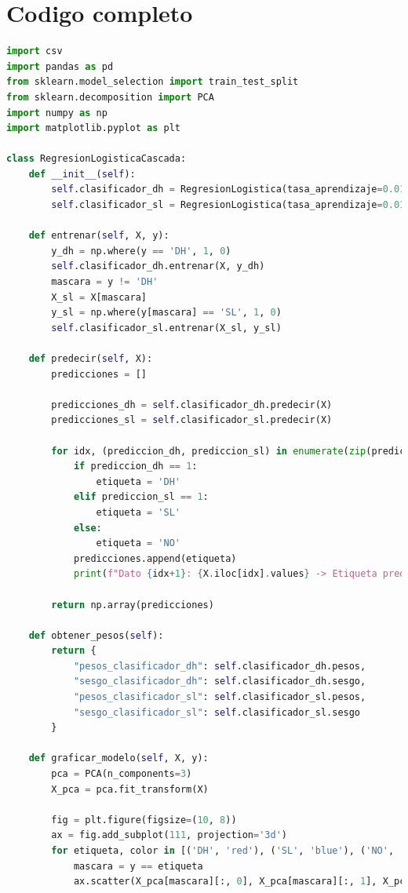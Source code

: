 \documentclass[12pt]{article}
\begin{document}
\section*{Codigo completo}
\begin{lstlisting}[language=Python]
import csv
import pandas as pd
from sklearn.model_selection import train_test_split
from sklearn.decomposition import PCA
import numpy as np
import matplotlib.pyplot as plt

class RegresionLogisticaCascada:
    def __init__(self):
        self.clasificador_dh = RegresionLogistica(tasa_aprendizaje=0.01, num_iteraciones=1000)
        self.clasificador_sl = RegresionLogistica(tasa_aprendizaje=0.01, num_iteraciones=1000)

    def entrenar(self, X, y):
        y_dh = np.where(y == 'DH', 1, 0)
        self.clasificador_dh.entrenar(X, y_dh)
        mascara = y != 'DH'
        X_sl = X[mascara]
        y_sl = np.where(y[mascara] == 'SL', 1, 0)
        self.clasificador_sl.entrenar(X_sl, y_sl)

    def predecir(self, X):
        predicciones = []

        predicciones_dh = self.clasificador_dh.predecir(X)
        predicciones_sl = self.clasificador_sl.predecir(X)

        for idx, (prediccion_dh, prediccion_sl) in enumerate(zip(predicciones_dh, predicciones_sl)):
            if prediccion_dh == 1:
                etiqueta = 'DH'
            elif prediccion_sl == 1:
                etiqueta = 'SL'
            else:
                etiqueta = 'NO'
            predicciones.append(etiqueta)
            print(f"Dato {idx+1}: {X.iloc[idx].values} -> Etiqueta predicha: {etiqueta}")

        return np.array(predicciones)

    def obtener_pesos(self):
        return {
            "pesos_clasificador_dh": self.clasificador_dh.pesos,
            "sesgo_clasificador_dh": self.clasificador_dh.sesgo,
            "pesos_clasificador_sl": self.clasificador_sl.pesos,
            "sesgo_clasificador_sl": self.clasificador_sl.sesgo
        }
        
    def graficar_modelo(self, X, y):
        pca = PCA(n_components=3)
        X_pca = pca.fit_transform(X)

        fig = plt.figure(figsize=(10, 8))
        ax = fig.add_subplot(111, projection='3d')
        for etiqueta, color in [('DH', 'red'), ('SL', 'blue'), ('NO', 'green')]:
            mascara = y == etiqueta
            ax.scatter(X_pca[mascara][:, 0], X_pca[mascara][:, 1], X_pca[mascara][:, 2], c=color, label=etiqueta, depthshade=True)


\end{lstlisting}
\end{document}
